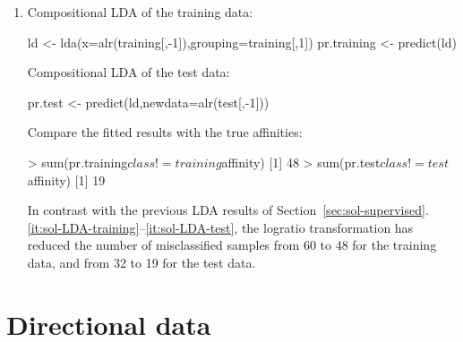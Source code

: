 \begin{enumerate}
\item Compositional LDA of the training data:

\begin{script}
ld <- lda(x=alr(training[,-1]),grouping=training[,1])
pr.training <- predict(ld)
\end{script}

Compositional LDA of the test data:

\begin{script}[firstnumber=3]
pr.test <- predict(ld,newdata=alr(test[,-1]))
\end{script}

Compare the fitted results with the true affinities:

\begin{console}
> sum(pr.training$class != training$affinity)
[1] 48
> sum(pr.test$class != test$affinity)
[1] 19
\end{console}

In contrast with the previous LDA results of
Section~\ref{sec:sol-supervised}.\ref{it:sol-LDA-training}--\ref{it:sol-LDA-test},
the logratio transformation has reduced the number of misclassified
samples from 60 to 48 for the training data, and from 32 to 19 for the
test data.

\end{enumerate}

\section{Directional data}
\label{sec:sol-directional}

